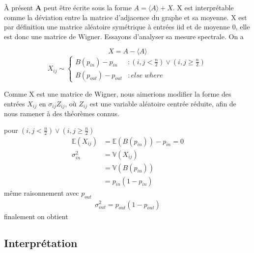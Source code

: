 À présent \textbf{A} peut être écrite sous la forme $A = \langle A \rangle + X$.
X est interprétable comme la déviation entre la matrice d'adjacence du graphe et sa moyenne.
X est par définition une matrice aléatoire symétrique à entrées iid et de moyenne 0, elle est donc une matrice de Wigner.
Essayons d'analyser sa mesure spectrale.
On a 

\begin{equation}
X = A - \langle A \rangle\nonumber
\end{equation}
\begin{equation}
	X_{ij} \sim \left\{
	\begin{array}{lr}
		B(p_{in}) - p_{in} & : (i,j < \frac{n}{2}) \lor (i,j \ge \frac{n}{2}) \\
		B(p_{out}) - p_{out} & : else \; where
	\end{array}
\right.\nonumber
\end{equation}

Comme X est une matrice de Wigner, nous aimerions modifier la forme des entrées $X_{ij}$ en $\sigma_{ij} Z_{ij}$, où $Z_{ij}$ est une variable aléatoire centrée réduite, afin de nous ramener à des théorèmes connus.

pour $(i,j < \frac{n}{2}) \lor (i,j \ge \frac{n}{2}) $
\begin{align*}
\mathbb{E}(X_{ij}) &= \mathbb{E}(B(p_{in}))- p_{in} = 0\\
\sigma_{in}^2 &= \mathbb{V}(X_{ij}) \\ 
			  &= \mathbb{V}(B(p_{in})) \\
			  &= p_{in} (1 - p_{in})
\end{align*}
même raisonnement avec $p_{out}$ 
\begin{align*}
\sigma_{out}^2 =  p_{out} (1 - p_{out})
\end{align*}
finalement on obtient 
\subsection{Interprétation}
